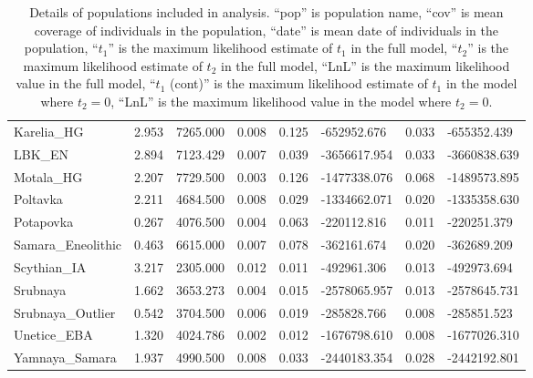 \documentclass[11pt, oneside]{article}   	%
\begin{document}
\begin{table}[h]
\begin{tabular}{llllllll}
Karelia\_HG             & 2.953  & 7265.000 & 0.008 & 0.125 & -652952.676  & 0.033       & -655352.439  \\
LBK\_EN                 & 2.894  & 7123.429 & 0.007 & 0.039 & -3656617.954 & 0.033       & -3660838.639 \\
Motala\_HG              & 2.207  & 7729.500 & 0.003 & 0.126 & -1477338.076 & 0.068       & -1489573.895 \\
Poltavka                & 2.211  & 4684.500 & 0.008 & 0.029 & -1334662.071 & 0.020       & -1335358.630 \\
Potapovka               & 0.267  & 4076.500 & 0.004 & 0.063 & -220112.816  & 0.011       & -220251.379  \\
Samara\_Eneolithic      & 0.463  & 6615.000 & 0.007 & 0.078 & -362161.674  & 0.020       & -362689.209  \\
Scythian\_IA            & 3.217  & 2305.000 & 0.012 & 0.011 & -492961.306  & 0.013       & -492973.694  \\
Srubnaya                & 1.662  & 3653.273 & 0.004 & 0.015 & -2578065.957 & 0.013       & -2578645.731 \\
Srubnaya\_Outlier       & 0.542  & 3704.500 & 0.006 & 0.019 & -285828.766  & 0.008       & -285851.523  \\
Unetice\_EBA            & 1.320  & 4024.786 & 0.002 & 0.012 & -1676798.610 & 0.008       & -1677026.310 \\
Yamnaya\_Samara         & 1.937  & 4990.500 & 0.008 & 0.033 & -2440183.354 & 0.028       & -2442192.801
\end{tabular}
\caption{Details of populations included in analysis. ``pop'' is population name, ``cov'' is mean coverage of individuals in the population, ``date'' is mean date of individuals in the population, ``$t_1$'' is the maximum likelihood estimate of $t_1$ in the full model, ``$t_2$'' is the maximum likelihood estimate of $t_2$ in the full model, ``LnL'' is the maximum likelihood value in the full model, ``$t_1$ (cont)'' is the maximum likelihood estimate of $t_1$ in the model where $t_2 = 0$, ``LnL'' is the maximum likelihood value in the model where $t_2 = 0$.}
\label{params_table}
\end{table}
\end{document}
